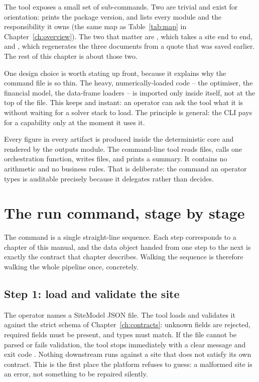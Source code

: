 The tool exposes a small set of sub-commands. Two are trivial and exist for orientation:  prints the package version, and  lists every module and the responsibility it owns (the same map as Table~\ref{tab:map} in Chapter~\ref{ch:overview}). The two that matter are , which takes a site end to end, and , which regenerates the three documents from a quote that was saved earlier. The rest of this chapter is about those two.

One design choice is worth stating up front, because it explains why the command file is so thin. The heavy, numerically-loaded code -- the optimiser, the financial model, the data-frame loaders -- is imported only inside  itself, not at the top of the file. This keeps  and  instant: an operator can ask the tool what it is without waiting for a solver stack to load. The principle is general: the CLI pays for a capability only at the moment it uses it.

\begin{keyidea}
Every figure in every artifact is produced inside the deterministic core and rendered by the outputs module. The command-line tool reads files, calls one orchestration function, writes files, and prints a summary. It contains no arithmetic and no business rules. That is deliberate: the command an operator types is auditable precisely because it delegates rather than decides.
\end{keyidea}

\section{The run command, stage by stage}

The  command is a single straight-line sequence. Each step corresponds to a chapter of this manual, and the data object handed from one step to the next is exactly the contract that chapter describes. Walking the sequence is therefore walking the whole pipeline once, concretely.

\subsection{Step 1: load and validate the site}

The operator names a SiteModel JSON file. The tool loads and validates it against the strict schema of Chapter~\ref{ch:contracts}: unknown fields are rejected, required fields must be present, and types must match. If the file cannot be parsed or fails validation, the tool stops immediately with a clear message and exit code . Nothing downstream runs against a site that does not satisfy its own contract. This is the first place the platform refuses to guess: a malformed site is an error, not something to be repaired silently.

